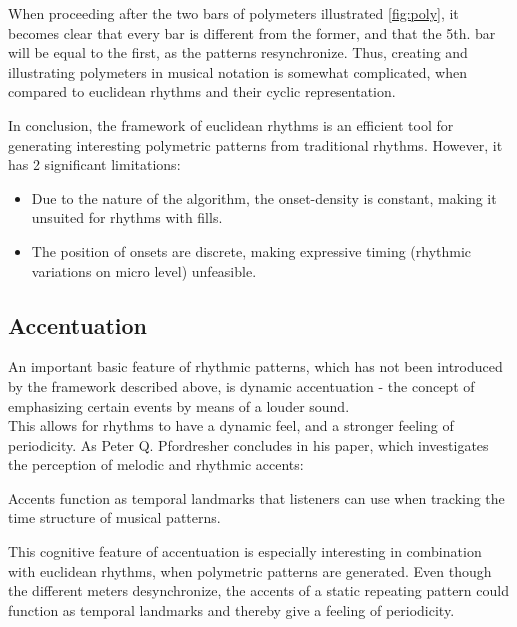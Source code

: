 When proceeding after the two bars of polymeters illustrated \cref{fig:poly}, it becomes clear that every bar is different from the former, and that the 5th. bar will be equal to the first, as the patterns resynchronize. Thus, creating and illustrating polymeters in musical notation is somewhat complicated, when compared to euclidean rhythms and their cyclic representation.


In conclusion, the framework of euclidean rhythms is an efficient tool for generating interesting polymetric patterns from traditional rhythms. However, it has 2 significant limitations: 
\begin{itemize}
    \item Due to the nature of the algorithm, the onset-density is constant, making it unsuited for rhythms with fills.
    \item The position of onsets are discrete, making expressive timing (rhythmic variations on micro level) unfeasible.
\end{itemize}

\subsection{Accentuation}
\label{sec:accent}
An important basic feature of rhythmic patterns, which has not been introduced by the framework described above, is dynamic accentuation - the concept of emphasizing certain events by means of a louder sound.\\ 
This allows for rhythms to have a dynamic feel, and a stronger feeling of periodicity. As Peter Q. Pfordresher concludes in his paper, which investigates the perception of melodic and rhythmic accents:
\begin{displayquote}
    Accents function as temporal landmarks that listeners can use when tracking the time structure of musical patterns.
\end{displayquote}\cite{accent}

This cognitive feature of accentuation is especially interesting in combination with euclidean rhythms, when polymetric patterns are generated. Even though the different meters desynchronize, the accents of a static repeating pattern could function as temporal landmarks and thereby give a feeling of periodicity.

